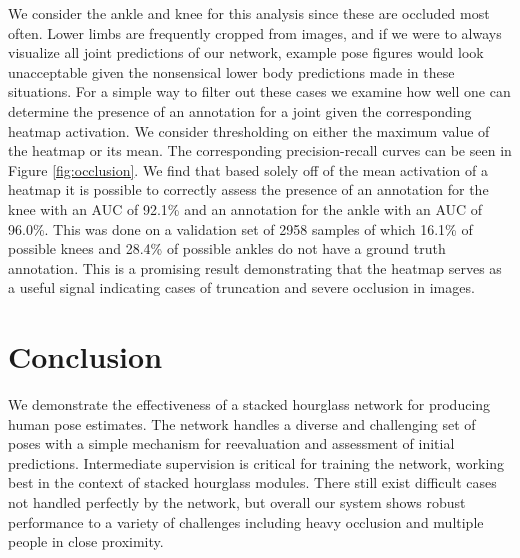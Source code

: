 \documentclass[runningheads]{llncs}
\begin{document}
We consider the ankle and knee for this analysis since these are
occluded most often. Lower limbs are frequently cropped from images,
and if we were to always visualize all joint predictions of our
network, example pose figures would look unacceptable given the
nonsensical lower body predictions made in these situations. For a
simple way to filter out these cases we examine how well one can
determine the presence of an annotation for a joint given the
corresponding heatmap activation. We consider thresholding on either
the maximum value of the heatmap or its mean. The corresponding
precision-recall curves can be seen in Figure \ref{fig:occlusion}. We
find that based solely off of the mean activation of a heatmap it is
possible to correctly assess the presence of an annotation for the
knee with an AUC of 92.1\% and an annotation for the ankle with
an AUC of 96.0\%. This was done on a validation set of 2958
samples of which 16.1\% of possible knees and 28.4\% of possible
ankles do not have a ground truth annotation. This is a promising
result demonstrating that the heatmap serves as a useful signal
indicating cases of truncation and severe occlusion in images.



\section{Conclusion}

We demonstrate the effectiveness of a stacked hourglass network for
producing human pose estimates. The network handles a diverse and
challenging set of poses with a simple mechanism for reevaluation and
assessment of initial predictions. Intermediate supervision is
critical for training the network, working best in the context of
stacked hourglass modules. There still exist difficult cases not
handled perfectly by the network, but overall our system shows robust
performance to a variety of challenges including heavy occlusion and
multiple people in close proximity.



\end{document}
